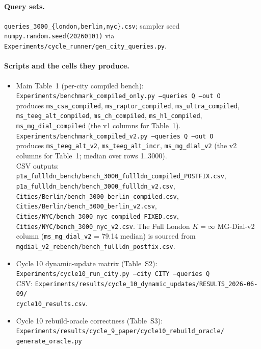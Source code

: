 \documentclass[letterpaper]{article}
\begin{document}
\paragraph{Query sets.}
\texttt{queries\_3000\_\{london,berlin,nyc\}.csv}; sampler seed
\texttt{numpy.random.seed(20260101)} via
\texttt{Experiments/cycle\_runner/gen\_city\_queries.py}.

\paragraph{Scripts and the cells they produce.}
\begin{itemize}
\item Main Table~1 (per-city compiled bench):\\
  \texttt{Experiments/benchmark\_compiled\_only.py --queries Q --out O}\\
  produces \texttt{ms\_csa\_compiled}, \texttt{ms\_raptor\_compiled},
  \texttt{ms\_ultra\_compiled}, \texttt{ms\_teeg\_alt\_compiled},
  \texttt{ms\_ch\_compiled}, \texttt{ms\_hl\_compiled},
  \texttt{ms\_mg\_dial\_compiled} (the v1 columns for Table~1).\\
  \texttt{Experiments/benchmark\_compiled\_v2.py --queries Q --out O}\\
  produces \texttt{ms\_teeg\_alt\_v2}, \texttt{ms\_teeg\_alt\_incr},
  \texttt{ms\_mg\_dial\_v2} (the v2 columns for Table~1; median over
  rows 1..3000).\\
  CSV outputs:
  \texttt{p1a\_fullldn\_bench/bench\_3000\_fullldn\_compiled\_POSTFIX.csv},
  \texttt{p1a\_fullldn\_bench/bench\_3000\_fullldn\_v2.csv},
  \texttt{Cities/Berlin/bench\_3000\_berlin\_compiled.csv},
  \texttt{Cities/Berlin/bench\_3000\_berlin\_v2.csv},
  \texttt{Cities/NYC/bench\_3000\_nyc\_compiled\_FIXED.csv},
  \texttt{Cities/NYC/bench\_3000\_nyc\_v2.csv}. The Full London
  $K\!=\!\infty$ MG-Dial-v2 column (\texttt{ms\_mg\_dial\_v2} = 79.14
  median) is sourced from
  \texttt{mgdial\_v2\_rebench/bench\_fullldn\_postfix.csv}.
\item Cycle 10 dynamic-update matrix (Table~S2):\\
  \texttt{Experiments/cycle10\_run\_city.py --city CITY --queries Q}\\
  CSV: \texttt{Experiments/results/cycle\_10\_dynamic\_updates/RESULTS\_2026-06-09/\\cycle10\_results.csv}.
\item Cycle 10 rebuild-oracle correctness (Table~S3):\\
  \texttt{Experiments/results/cycle\_9\_paper/cycle10\_rebuild\_oracle/\\generate\_oracle.py}\\

\end{itemize}
\end{document}
